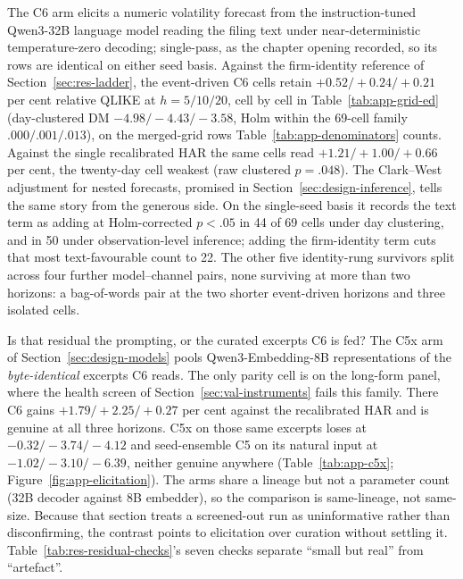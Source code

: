 The C6 arm elicits a numeric volatility forecast from the instruction-tuned Qwen3-32B language model \cite{qwen3_2025} reading the filing text under near-deterministic temperature-zero decoding; single-pass, as the chapter opening recorded, so its rows are identical on either seed basis. %
Against the firm-identity reference of Section~\ref{sec:res-ladder}, the event-driven C6 cells retain $+0.52/+0.24/+0.21$ per cent relative QLIKE at $h{=}5/10/20$, cell by cell in Table~\ref{tab:app-grid-ed} (day-clustered DM $-4.98/-4.43/-3.58$, Holm within the 69-cell family $.000/.001/.013$), on the merged-grid rows Table~\ref{tab:app-denominators} counts. %
Against the single recalibrated HAR the same cells read $+1.21/+1.00/+0.66$ per cent, the twenty-day cell weakest (raw clustered $p=.048$). %
The Clark--West adjustment for nested forecasts, promised in Section~\ref{sec:design-inference}, tells the same story from the generous side. On the single-seed basis it records the text term as adding at Holm-corrected $p<.05$ in 44 of 69 cells under day clustering, and in 50 under observation-level inference; adding the firm-identity term cuts that most text-favourable count to 22. %
The other five identity-rung survivors split across four further model--channel pairs, none surviving at more than two horizons: a bag-of-words pair at the two shorter event-driven horizons and three isolated cells. %

Is that residual the prompting, or the curated excerpts C6 is fed? The C5x arm of Section~\ref{sec:design-models} pools Qwen3-Embedding-8B representations of the \emph{byte-identical} excerpts C6 reads. The only parity cell is on the long-form panel, where the health screen of Section~\ref{sec:val-instruments} fails this family. There C6 gains $+1.79/+2.25/+0.27$ per cent against the recalibrated HAR and is genuine at all three horizons. C5x on those same excerpts loses at $-0.32/-3.74/-4.12$ and seed-ensemble C5 on its natural input at $-1.02/-3.10/-6.39$, neither genuine anywhere (Table~\ref{tab:app-c5x}; Figure~\ref{fig:app-elicitation}). The arms share a lineage but not a parameter count (32B decoder against 8B embedder), so the comparison is same-lineage, not same-size. Because that section treats a screened-out run as uninformative rather than disconfirming, the contrast points to elicitation over curation without settling it. %
Table~\ref{tab:res-residual-checks}'s seven checks separate ``small but real'' from ``artefact''.

